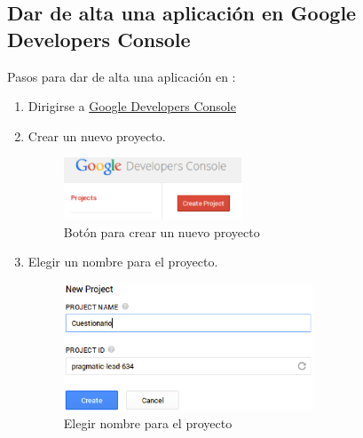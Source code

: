 \subsection{Dar de alta una aplicaci\'on en Google Developers Console}
\label{subsec:Apendice2.13}

Pasos para dar de alta una aplicaci\'on en :
\begin{enumerate}
  \item Dirigirse a \href{https://console.developers.google.com/}{Google Developers Console}
  
  \item Crear un nuevo proyecto.
  \begin{figure}[H]
  \begin{center}
  \includegraphics[width=0.5\textwidth]{images/gdc0.eps}
  \caption{Bot\'on para crear un nuevo proyecto}
  \label{fig:gdc0}
  \end{center}
  \end{figure}
  
  \item Elegir un nombre para el proyecto.
  \begin{figure}[!th]
  \begin{center}
  \includegraphics[width=0.7\textwidth]{images/gdc1.eps}
  \caption{Elegir nombre para el proyecto}
  \label{fig:gdc1}
  \end{center}
  \end{figure}
  \newpage
  

\end{enumerate}

